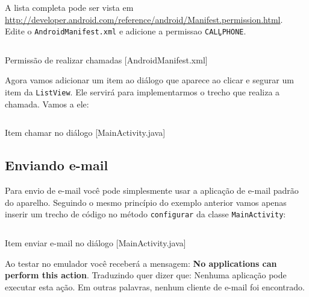 A lista completa pode ser vista em 
\url{http://developer.android.com/reference/android/Manifest.permission.html}.\\

Edite o \texttt{AndroidManifest.xml} e adicione a permissao \texttt{CALL\b{ }PHONE}.

\begin{listing}[H]
  \inputminted[linenos=true,frame=bottomline,tabsize=3]{ xml }{ source/AndroidManifest-3.xml }
  \caption{Permissão de realizar chamadas [AndroidManifest.xml]}
\end{listing}

Agora vamos adicionar um item ao diálogo que aparece ao clicar e segurar um item da \texttt{ListView}.
Ele servirá para implementarmos o trecho que realiza a chamada. Vamos a ele:

\begin{listing}[H]
  \inputminted[linenos=true,frame=bottomline,tabsize=3]{ java }{ source/MainActivity-10.java }
  \caption{Item chamar no diálogo [MainActivity.java]}
\end{listing}

\subsection{Enviando e-mail}

Para envio de e-mail você pode simplesmente usar a aplicação de e-mail padrão do aparelho.
Seguindo o mesmo princípio do exemplo anterior vamos apenas inserir um trecho de código
no método \texttt{configurar} da classe \texttt{MainActivity}:

\begin{listing}[H]
  \inputminted[linenos=true,frame=bottomline,tabsize=3]{ java }{ source/MainActivity-11.java }
  \caption{Item enviar e-mail no diálogo [MainActivity.java]}
\end{listing}

Ao testar no emulador você receberá a mensagem: \textbf{No applications can perform this action}. Traduzindo
quer dizer que: Nenhuma aplicação pode executar esta ação. Em outras palavras, nenhum cliente de e-mail
foi encontrado.
 
%  
% 
% 
% 
